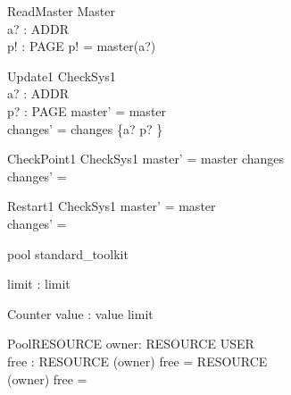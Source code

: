 \documentclass{llncs}
\begin{document}
\begin{schema}{ReadMaster}
\Xi Master \\
a? : ADDR \\
p! : PAGE
\where
p! = master(a?)
\end{schema}

\begin{schema}{Update1}
\Delta CheckSys1 \\
a? : ADDR \\
p? : PAGE
\where
master' = master \\
changes' = changes \oplus \{a? \mapsto p? \}
\end{schema}

\begin{schema}{CheckPoint1}
\Delta CheckSys1
\where
master' = master \oplus changes \\
changes' = \emptyset
\end{schema}

\begin{schema}{Restart1}
\Delta CheckSys1
\where master' = master \\
changes' = \emptyset
\end{schema}



\begin{zsection}
\SECTION pool \parents standard\_toolkit
\end{zsection}

\begin{axdef}
limit : \nat
\where
limit 
\end{axdef}

\begin{schema}{Counter}
value : \nat
\where
value \leq limit
\end{schema}

\begin{genschema}{Pool}{RESOURCE}
owner: RESOURCE \pfun USER \\
free : \power RESOURCE
\where
(\dom owner) \uni free = RESOURCE \\
(\dom owner) \int free = \emptyset
\end{genschema}
\end{document}
